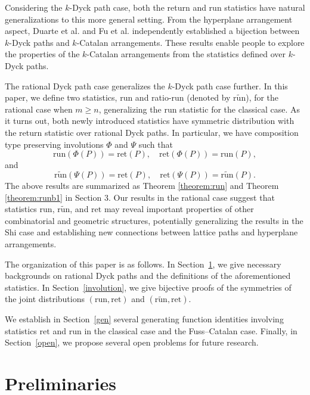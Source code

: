 \documentclass[11pt,a4paper,reqno]{article}
\newcommand{\tref}[1]{Theorem \ref{theorem:#1}}
\newcommand{\run}{\mathrm{run}}
\newcommand{\runb}{\widetilde{{\mathrm{run}}}}
\newcommand{\ret}{\mathrm{ret}}
\begin{document}
{    

     
    
    Considering the $k$-Dyck path case, both the return and run statistics have natural generalizations to this more general setting. From the hyperplane arrangement aspect, Duarte et al. \cite{Dua3} and Fu et al. \cite{Fu} independently established a bijection between $k$-Dyck paths and $k$-Catalan arrangements.
    These results enable people to explore the properties of the $k$-Catalan arrangements from the statistics defined over $k$-Dyck paths.

    The rational Dyck path case generalizes the $k$-Dyck path case further. In this paper, we define two statistics, {run} and ratio-run (denoted by $\runb$), for the rational case when $m\geq n$, generalizing the run statistic for the classical case. As it turns out, both newly introduced statistics have symmetric distribution with the return statistic over rational Dyck paths. In particular, we have composition type preserving involutions $\Phi$ and $\Psi$ such that
$$
         \run(\Phi(P))=\ret(P),\quad \ret(\Phi(P))=\run(P),
$$
and
$$
         \runb(\Psi(P))=\ret(P),\quad \ret(\Psi(P))=\runb(P).
$$ 
    The above results are summarized as \tref{run} and \tref{runb1} in Section 3. 
    Our results in the rational case suggest that statistics $\run$, $\runb$, and $\ret$ may reveal important properties of other combinatorial and geometric structures, potentially generalizing the results in the Shi case and establishing new connections between lattice paths and hyperplane arrangements.
 
     
     
    
	
	
	
	
	
	
	
	The organization of this paper is as follows. In Section~\ref{preliminary}, we give necessary backgrounds on rational Dyck paths {and the definitions of the aforementioned statistics.} In Section~\ref{involution},
	we give bijective proofs of the symmetries of the joint distributions $(\run, \ret)$ and $(\runb, \ret)$.
	
	{We establish in Section~\ref{gen} several generating function identities} involving statistics $\ret$ and $\run$ in the classical case and the Fuss--Catalan case. Finally, in Section~\ref{open}, we propose several open problems for future research.
	
	
	
	\section{Preliminaries}\label{preliminary}
	
}
\end{document}
